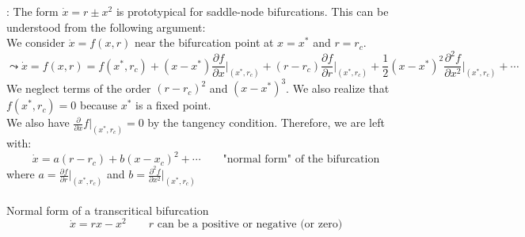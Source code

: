 \noindent\textbf{\underline{}}: The form $\dot{x}=r\pm x^2$ is prototypical for saddle-node bifurcations. This can be understood from the following argument:\\
We consider $\dot{x}=f(x,r)$ near the bifurcation point at $x=x^\ast$ and $r=r_c$.
\begin{equation*}
	\leadsto \dot{x}=f(x,r)=f(x^\ast,r_c) + (x-x^\ast)\frac{\partial f}{\partial x}\Big|_{(x^\ast,r_c)}+(r-r_c) \frac{\partial f}{\partial r}\Big|_{(x^\ast,r_c)}+\frac{1}{2}(x-x^\ast)^2\frac{\partial^2 f}{\partial x^2}\Big|_{(x^\ast,r_c)} + \cdots
\end{equation*}
We neglect terms of the order $(r-r_c)^2$ and $(x-x^\ast)^3$. We also realize that $f(x^\ast,r_c)=0$ because $x^\ast$ is a fixed point.\\
We also have $\frac{\partial}{\partial x}f\Big|_{(x^\ast,r_c)}=0$ by the tangency condition. Therefore, we are left with:
\begin{equation*}
	\dot{x}=a(r-r_c)+b(x-x_c)^2+\cdots \qquad \text{"normal form"{} of the bifurcation}
\end{equation*}
where $a=\frac{\partial f}{\partial r}\Big|_{(x^\ast,r_c)}$ and $b=\frac{\partial^2 f}{\partial x^2}\Big|_{(x^\ast,r_c)}$\vspace{0.5cm}\\
\textbf{\underline{}}\vspace{0.2 cm}\\
Normal form of a transcritical bifurcation
\begin{equation*}
	\dot{x}=rx-x^2 \qquad \text{$r$ can be a positive or negative (or zero)}
\end{equation*}
